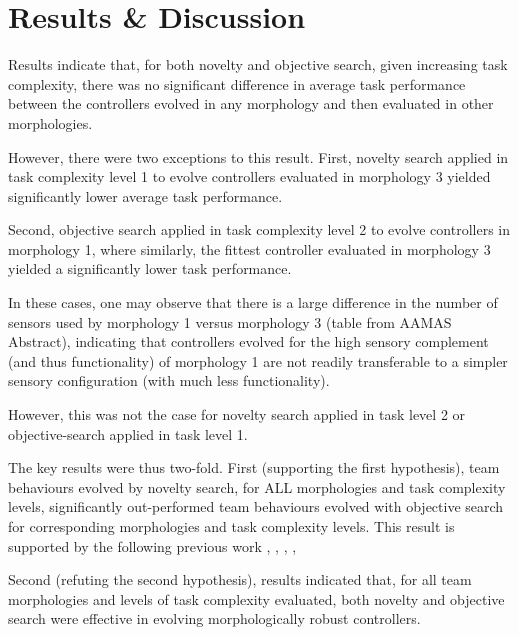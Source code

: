 \chapter{Results \& Discussion}
\label{Chapter5}


Results indicate that, for both novelty and objective search, given increasing task complexity, there was no significant difference in average task performance between the controllers evolved in any morphology and then evaluated in other morphologies.

However, there were two exceptions to this result. 
First, novelty search applied in task complexity level 1 to evolve controllers evaluated in morphology 3 yielded significantly lower average task performance.

Second, objective search applied in task complexity level 2 to evolve controllers in morphology 1, where similarly, the fittest controller evaluated in morphology 3 yielded a significantly lower task performance.

In these cases, one may observe that there is a large difference in the number of sensors used by morphology 1 versus morphology 3 (table from AAMAS Abstract), indicating that controllers evolved for the high sensory complement (and thus functionality) of morphology 1 are not readily transferable to a simpler sensory configuration (with much less functionality). 

However, this was not the case for novelty search applied in task level 2 or objective-search  applied in task level 1.

The key results were thus two-fold. 
First (supporting the first hypothesis), team behaviours evolved by novelty search, for ALL morphologies and task complexity levels, significantly out-performed team behaviours evolved with objective search for corresponding morphologies and task complexity levels. 
	This result is supported by the following previous work 
		\cite{DidiNitschke2016SSCI}, 
		\cite{DidiNitschke2016},
		\cite{gomes2013generic},
		\cite{RefWorks:5},
		\cite{RefWorks:11}

Second (refuting the second hypothesis), results indicated that, for all team morphologies and levels of task complexity evaluated, both novelty and objective search were effective in evolving morphologically robust controllers.


